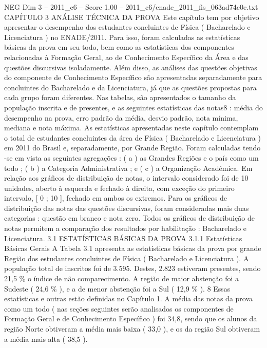 \begin{textsample}{NEG Dim 3 – 2011\_c6 – Score 1.00 – 2011\_c6/enade\_2011\_fis\_063ad74c0e.txt}  \label{ex:f3_neg_081}
CAPÍTULO 3 ANÁLISE TÉCNICA DA PROVA Este capítulo tem por objetivo apresentar o desempenho dos estudantes concluintes de Física ( Bacharelado e Licenciatura ) no ENADE/2011.
Para isso, foram calculadas as estatísticas básicas da prova em seu todo, bem como as estatísticas dos componentes relacionadas à Formação Geral, ao de Conhecimento Específico da Área e das questões discursivas isoladamente.
Além disso, as análises das questões objetivas do componente de Conhecimento Específico são apresentadas separadamente para concluintes do Bacharelado e da Licenciatura, já que as questões propostas para cada grupo foram diferentes.
Nas tabelas, são apresentados o tamanho da população inscrita e de presentes, e as seguintes estatísticas das notas8 : média do desempenho na prova, erro padrão da média, desvio padrão, nota mínima, mediana e nota máxima.
As estatísticas apresentadas neste capítulo contemplam o total de estudantes concluintes da área de Física ( Bacharelado e Licenciatura ) em 2011 do Brasil e, separadamente, por Grande Região.
Foram calculadas tendo -se em vista as seguintes agregações : ( a ) as Grandes Regiões e o país como um todo ; ( b ) a Categoria Administrativa ; e ( c ) a Organização Acadêmica.
Em relação aos gráficos de distribuição de notas, o intervalo considerado foi de 10 unidades, aberto à esquerda e fechado à direita, com exceção do primeiro intervalo, [ 0 ; 10 ], fechado em ambos os extremos.
Para os gráficos de distribuição das notas das questões discursivas, foram consideradas mais duas categorias : questão em branco e nota zero.
Todos os gráficos de distribuição de notas permitem a comparação dos resultados por habilitação : Bacharelado e Licenciatura. 3.1 ESTATÍSTICAS BÁSICAS DA PROVA 3.1.1 Estatísticas Básicas Gerais A Tabela 3.1 apresenta as estatísticas básicas da prova por grande Região dos estudantes concluintes de Física ( Bacharelado e Licenciatura ).
A população total de inscritos foi de 3.595.
Destes, 2.823 estiveram presentes, sendo 21,5 \% o índice de não comparecimento.
A região de maior abstenção foi a Sudeste ( 24,6 \% ), e a de menor abstenção foi a Sul ( 12,9 \% ). 8 Essas estatísticas e outras estão definidas no Capítulo 1.
A média das notas da prova como um todo ( nas seções seguintes serão analisados os componentes de Formação Geral e de Conhecimento Específico ) foi 34,8, sendo que os alunos da região Norte obtiveram a média mais baixa ( 33,0 ), e os da região Sul obtiveram a média mais alta ( 38,5 ).

\end{textsample}
